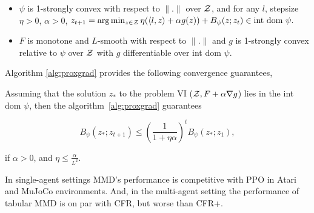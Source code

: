 \begin{itemize}
	\item $\psi$ is 1-strongly convex with respect to $\|.
		      \|$ over $\mathcal{Z}$, and for
	      any $l$, stepsize $\eta > 0$, $\alpha > 0$,
	      $z_{t+1} = \arg \min_{z \in \mathcal{Z}} \eta (\langle l, z \rangle + \alpha g(z)) + B_{\psi}(z;z_t) \in \text{int dom } \psi.$

	\item $F$ is monotone and $L$-smooth with respect to $\|.\|$ and $g$ is 1-strongly convex
	      relative to $\psi$ over $\mathcal{Z}$ with $g$ differentiable over int dom $\psi$.
\end{itemize}

Algorithm \ref{alg:proxgrad} provides the following convergence guarantees,

Assuming that the solution $z_{\ast}$ to the problem VI ($\mathcal{Z}, F + \alpha \nabla g$) lies in the
int dom $\psi$, then the algorithm~\ref{alg:proxgrad} guarantees

\[ B_{\psi}
	(z_{\ast}; z_{t + 1}) \leq {\left(\frac{1}{1 + \eta \alpha}\right)}^t B_{\psi} (z_{\ast}; z_1), \]

if $\alpha > 0$, and $\eta \leq \frac{\alpha}{L^2}$.

In single-agent settings MMD's performance is competitive with PPO in Atari and MuJoCo
environments.
And, in the multi-agent setting the performance of tabular MMD is on par with CFR, but worse than
CFR+.
